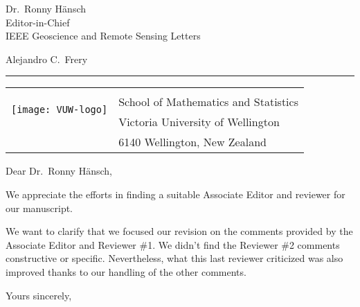 \documentclass[12pt]{letter} %
\begin{document}
\signature{\texttt{[image: assinatura\_blue-no\_background]}\\
Alejandro C.\ Frery\\
\mbox{Professor of Statistics and Data Science}\\
alejandro.frery@vuw.ac.nz}           %
\longindentation=0pt                       %
\let\raggedleft\raggedright                %
 
\begin{letter}{Dr.\ Ronny Hänsch\\
	Editor-in-Chief\\
	IEEE Geoscience and Remote Sensing Letters}
\date{4 June 2025}

\begin{flushleft}
Alejandro C.\ Frery
\end{flushleft}
\smallskip\hrule height 2pt
\begin{flushright}
\begin{tabular}{rl}
\multirow{3}{*}[20pt]{\texttt{[image: VUW-logo]}}	\\
& \small School of Mathematics and Statistics\\
	& \small Victoria University of Wellington\\
	& \small  6140 Wellington, New Zealand
\end{tabular}
\end{flushright} 
\vfill %

\opening{Dear Dr.\ Ronny Hänsch,} 

We appreciate the efforts in finding a suitable Associate Editor and reviewer for our manuscript.

We want to clarify that we focused our revision on the comments provided by the Associate Editor and Reviewer \#1.
We didn't find the Reviewer \#2 comments constructive or specific.
Nevertheless, what this last reviewer criticized was also improved thanks to our handling of the other comments.

\closing{Yours sincerely,} 
  

\end{letter}
\end{document}
